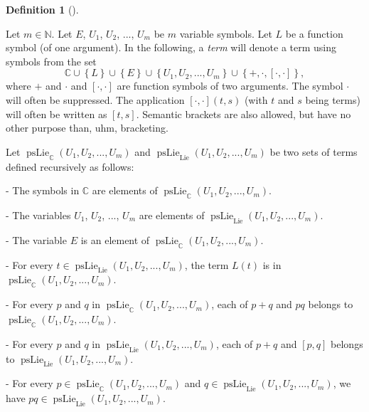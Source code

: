 \documentclass
[numbers=enddot,12pt,final,onecolumn,german,notitlepage]{scrartcl}%
\theoremstyle{definition}
\newtheorem{defi}[theo]{Definition}
\newenvironment{definition}[1][]
{\begin{defi}[#1]\begin{leftbar}}
{\end{leftbar}\end{defi}}
\begin{document}
\begin{definition}
Let $m\in\mathbb{N}$. Let $E$, $U_{1}$, $U_{2}$, $...$, $U_{m}$ be $m$
variable symbols. Let $L$ be a function symbol (of one argument). In the
following, a \textit{term} will denote a term using symbols from the set%
\[
\mathbb{C}\cup\left\{  L\right\}  \cup\left\{  E\right\}  \cup\left\{
U_{1},U_{2},...,U_{m}\right\}  \cup\left\{  +,\cdot,\left[  \cdot
,\cdot\right]  \right\}  ,
\]
where $+$ and $\cdot$ and $\left[  \cdot,\cdot\right]  $ are function symbols
of two arguments. The symbol $\cdot$ will often be suppressed. The application
$\left[  \cdot,\cdot\right]  \left(  t,s\right)  $ (with $t$ and $s$ being
terms) will often be written as $\left[  t,s\right]  $. Semantic brackets are
also allowed, but have no other purpose than, uhm, bracketing.

Let $\operatorname*{psLie}\nolimits_{\mathbb{C}}\left(  U_{1},U_{2}%
,...,U_{m}\right)  $ and $\operatorname*{psLie}\nolimits_{\operatorname*{Lie}%
}\left(  U_{1},U_{2},...,U_{m}\right)  $ be two sets of terms defined
recursively as follows:

- The symbols in $\mathbb{C}$ are elements of $\operatorname*{psLie}%
\nolimits_{\mathbb{C}}\left(  U_{1},U_{2},...,U_{m}\right)  $.

- The variables $U_{1}$, $U_{2}$, $...$, $U_{m}$ are elements of
$\operatorname*{psLie}\nolimits_{\operatorname*{Lie}}\left(  U_{1}%
,U_{2},...,U_{m}\right)  $.

- The variable $E$ is an element of $\operatorname*{psLie}%
\nolimits_{\mathbb{C}}\left(  U_{1},U_{2},...,U_{m}\right)  $.

- For every $t\in\operatorname*{psLie}\nolimits_{\operatorname*{Lie}}\left(
U_{1},U_{2},...,U_{m}\right)  $, the term $L\left(  t\right)  $ is in
$\operatorname*{psLie}\nolimits_{\mathbb{C}}\left(  U_{1},U_{2},...,U_{m}%
\right)  $.

- For every $p$ and $q$ in $\operatorname*{psLie}\nolimits_{\mathbb{C}}\left(
U_{1},U_{2},...,U_{m}\right)  $, each of $p+q$ and $pq$ belongs to
$\operatorname*{psLie}\nolimits_{\mathbb{C}}\left(  U_{1},U_{2},...,U_{m}%
\right)  $.

- For every $p$ and $q$ in $\operatorname*{psLie}%
\nolimits_{\operatorname*{Lie}}\left(  U_{1},U_{2},...,U_{m}\right)  $, each
of $p+q$ and $\left[  p,q\right]  $ belongs to $\operatorname*{psLie}%
\nolimits_{\operatorname*{Lie}}\left(  U_{1},U_{2},...,U_{m}\right)  $.

- For every $p\in\operatorname*{psLie}\nolimits_{\mathbb{C}}\left(
U_{1},U_{2},...,U_{m}\right)  $ and $q\in\operatorname*{psLie}%
\nolimits_{\operatorname*{Lie}}\left(  U_{1},U_{2},...,U_{m}\right)  $, we
have $pq\in\operatorname*{psLie}\nolimits_{\operatorname*{Lie}}\left(
U_{1},U_{2},...,U_{m}\right)  $.


\end{definition}
\end{document}

